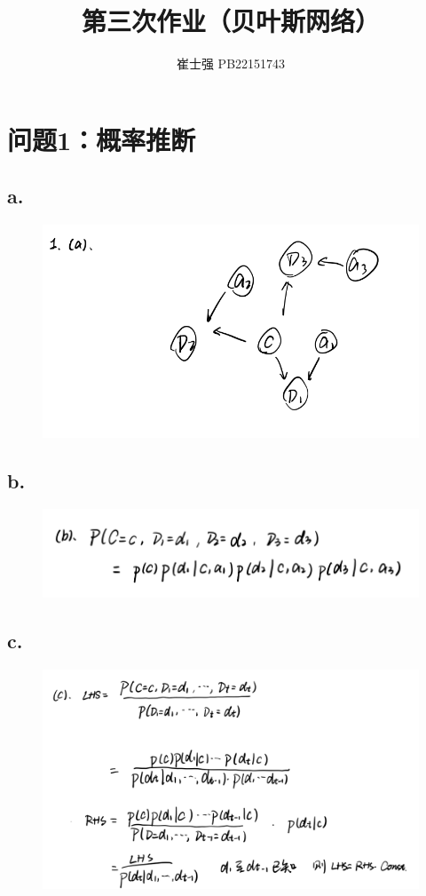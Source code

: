 \documentclass{article}
\title{\bfseries 第三次作业（贝叶斯网络）}
\author{崔士强  \quad  PB22151743}
\begin{document}
\maketitle

\section*{问题1：概率推断}
\subsection*{a.}
\begin{figure}[H]
    \centering
    \includegraphics[scale=0.5]{1a.png}
\end{figure}
\subsection*{b.}
\begin{figure}[H]
    \centering
    \includegraphics[scale=0.5]{1b.png}
\end{figure}
\subsection*{c.}
\begin{figure}[H]
    \centering
    \includegraphics[scale=0.5]{1c.png}
\end{figure}
\end{document}
